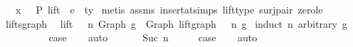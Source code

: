\begin{isabellebody}
\ \ \ {\isachardoublequoteopen}x\ {\isacharhash}{\kern0pt}\ {\isasymGamma}\ {\isasymturnstile}{\isacharbraceleft}{\kern0pt}P{\isacharbraceright}{\kern0pt}\ {\isacharparenleft}{\kern0pt}lift\ {}\ e{\isacharparenright}{\kern0pt}\ {\isacharcolon}{\kern0pt}\ ty{\isachardoublequoteclose}\isanewline
%
\isadelimproof
%
\endisadelimproof
%
\isatagproof
{}\isamarkupfalse%
\ {\isacharparenleft}{\kern0pt}metis\ assms\ insert{\isacharunderscore}{\kern0pt}at{\isachardot}{\kern0pt}simps{\isacharparenleft}{\kern0pt}{}{\isacharparenright}{\kern0pt}\ lift{\isacharunderscore}{\kern0pt}type\ surj{\isacharunderscore}{\kern0pt}pair\ zero{\isacharunderscore}{\kern0pt}le{\isacharparenright}{\kern0pt}%
\endisatagproof
{\isafoldproof}%
%
\isadelimproof
\isanewline
%
\endisadelimproof
\isanewline
\isanewline
{}\isamarkupfalse%
\ lifts{\isacharunderscore}{\kern0pt}graph{}{\isacharcolon}{\kern0pt}\isanewline
\ \ {\isachardoublequoteopen}{\isacharparenleft}{\kern0pt}lift\ {}\ {\isacharcircum}{\kern0pt}{\isacharcircum}{\kern0pt}\ n{\isacharparenright}{\kern0pt}\ {\isacharparenleft}{\kern0pt}Graph\ g{\isacharparenright}{\kern0pt}\ {\isacharequal}{\kern0pt}\ Graph\ {\isacharparenleft}{\kern0pt}{\isacharparenleft}{\kern0pt}lift{\isacharunderscore}{\kern0pt}graph\ {}\ {\isacharcircum}{\kern0pt}{\isacharcircum}{\kern0pt}\ n{\isacharparenright}{\kern0pt}\ g{\isacharparenright}{\kern0pt}{\isachardoublequoteclose}\isanewline
%
\isadelimproof
%
\endisadelimproof
%
\isatagproof
{}\isamarkupfalse%
\ {\isacharparenleft}{\kern0pt}induct\ n\ arbitrary{\isacharcolon}{\kern0pt}\ g{\isacharparenright}{\kern0pt}\isanewline
\ \ \isamarkupfalse%
\ {}\isanewline
\ \ \isamarkupfalse%
\ \isamarkupfalse%
\ {\isacharquery}{\kern0pt}case\isanewline
\ \ \isamarkupfalse%
\ auto\isanewline
\ \ \isamarkupfalse%
\isanewline
{}\isamarkupfalse%
\isanewline
\ \ \isamarkupfalse%
\ {\isacharparenleft}{\kern0pt}Suc\ n{\isacharparenright}{\kern0pt}\isanewline
\ \ \isamarkupfalse%
\ \isamarkupfalse%
\ {\isacharquery}{\kern0pt}case\isanewline
\ \ \isamarkupfalse%
\ auto\isanewline
\ \ \isamarkupfalse%
\isanewline
{}\isamarkupfalse%
%
\endisatagproof
{\isafoldproof}%
%
\isadelimproof
\isanewline
%
\endisadelimproof
\isanewline
\isanewline

\end{isabellebody}

